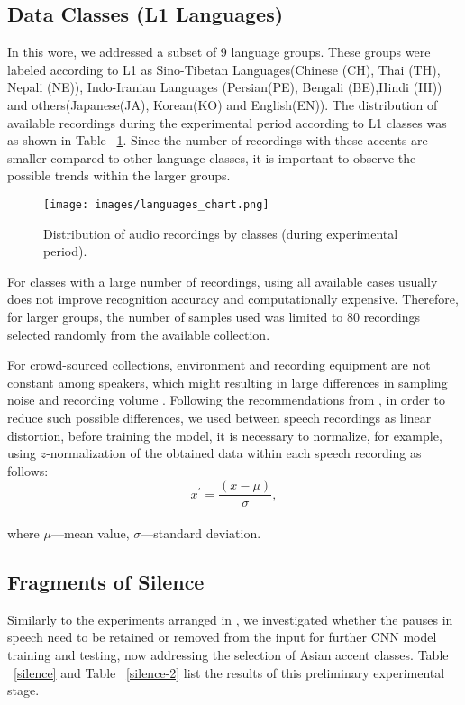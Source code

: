 \documentclass[ams]{U-AizuGT}
\begin{document}
\subsection{Data Classes (L1 Languages)}
In this wore, we addressed a subset of 9 language groups. These groups were labeled according to L1 as Sino-Tibetan Languages(Chinese (CH), Thai (TH), Nepali (NE)), Indo-Iranian Languages (Persian(PE), Bengali (BE),Hindi (HI)) and others(Japanese(JA), Korean(KO) and English(EN)). The distribution of available recordings during the experimental period according to L1 classes was as shown in Table ~\ref{languages-chart}. Since the number of recordings with these accents are smaller compared to other language classes, it is important to  observe the possible trends within the larger groups.
\begin{figure}[h]
    \centering
    \texttt{[image: images/languages\_chart.png]}
    \caption{Distribution of audio recordings by classes (during experimental period).}
    \label{languages-chart}
\end{figure}
For classes with a large number of recordings, using all available cases usually does not improve recognition accuracy and computationally expensive. Therefore, for larger groups, the number of samples used was limited to 80 recordings selected randomly from the available collection.\par
For crowd-sourced collections, environment and recording equipment are not constant among speakers, which might resulting in large differences in sampling noise and recording volume \cite{Ahamad:acc}.
Following the recommendations from \cite{Veranika:lang, Ahamad:acc}, in order to reduce such possible differences, we used between speech recordings as linear distortion, before training the model, it is necessary to normalize, for example, using $z$-normalization of the obtained data within each speech recording as follows:
\\
\begin{equation}
x^{\prime}=\frac{(x-\mu)}{\sigma},
\end{equation}
\\
where $\mu$---mean value, $\sigma$---standard deviation.

\subsection{Fragments of Silence}

Similarly to the experiments arranged in \cite{Veranika:lang, Boula:the}, we investigated whether the pauses in speech need to be retained or removed from the input for further CNN model training and testing, now addressing the selection of Asian accent classes. Table ~\ref{silence} and Table ~\ref{silence-2} list  the results of this preliminary experimental stage. 
\end{document}
